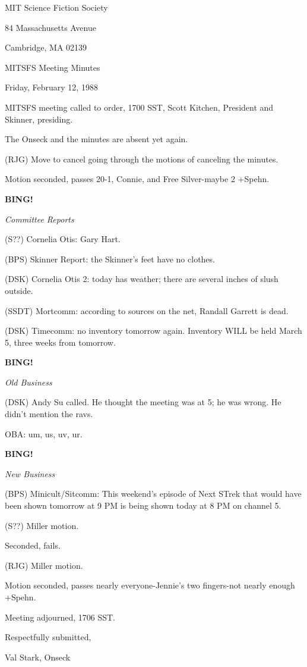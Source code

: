 \documentclass[12pt]{article}
\newcommand{\bing}{{\bf BING!} }
\newcommand{\goto}[1]{\bing \vskip 12pt \centerline{{\em{#1}}}}
\begin{document}
\begin{center}

MIT Science Fiction Society 

84 Massachusetts Avenue

Cambridge, MA 02139

\vspace{12pt}

MITSFS Meeting Minutes 

Friday, February 12, 1988

\end{center}
 
\vspace{18pt}

\setlength{\parskip}{6pt}

\noindent
MITSFS meeting called to order, 1700 SST,
Scott Kitchen, President and Skinner, presiding.

The Onseck and the minutes are absent yet again.

(RJG) Move to cancel going through the motions of canceling the minutes.

Motion seconded, passes 20-1, Connie, and Free Silver-maybe 2 +Spehn.

\goto{Committee Reports}

(S??) Cornelia Otis: Gary Hart.

(BPS) Skinner Report: the Skinner's feet have no clothes.

(DSK) Cornelia Otis 2: today has weather; there are several inches of slush outside.

(SSDT) Mortcomm: according to sources on the net, Randall Garrett is dead.

(DSK) Timecomm: no inventory tomorrow again. Inventory WILL be held March 5, three weeks from tomorrow.

\goto{Old Business}

(DSK) Andy Su called. He thought the meeting was at 5; he was wrong. He didn't mention the ravs.

OBA: um, us, uv, ur.

\goto{New Business}

(BPS) Minicult/Sitcomm: This weekend's episode of Next STrek that would have been shown tomorrow at 9 PM is being shown today at 8 PM on channel 5.

(S??) Miller motion.

Seconded, fails.

(RJG) Miller motion.

Motion seconded, passes nearly everyone-Jennie's two fingers-not nearly enough +Spehn.

\vspace{12pt}

\noindent
Meeting adjourned, 1706 SST.

\vspace{18pt}

\centerline{Respectfully submitted,}
\centerline{Val Stark, Onseck}
\end{document}
